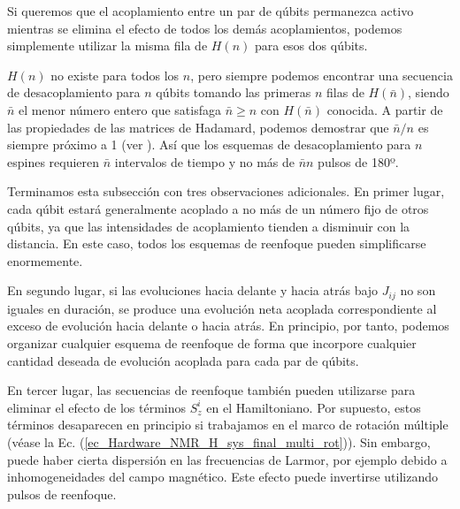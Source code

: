 \documentclass[a4paper,11pt]{book} %
\numberwithin{equation}{chapter}
\begin{document}
Si queremos que el acoplamiento entre un par de qúbits permanezca activo mientras se elimina el efecto de todos los demás acoplamientos, podemos simplemente utilizar la misma fila de $H(n)$ para esos dos qúbits. 

$H(n)$ no existe para todos los $n$, pero siempre podemos encontrar una secuencia de desacoplamiento para $n$ qúbits tomando las primeras $n$ filas de $H(\bar{n})$, siendo $\bar{n}$ el menor número entero que satisfaga $\bar{n} \geq n $ con $H(\bar{n})$ conocida. A partir de las propiedades de las matrices de Hadamard, podemos demostrar que $\bar{n}/n$ es siempre próximo a 1 (ver \cite{bib_Hardware_NMR_reenfoque_Hadammard_1}). Así que los esquemas de desacoplamiento para $n$ espines requieren $\bar{n}$ intervalos de tiempo y no más de $\bar{n}n$ pulsos de 180º.

Terminamos esta subsección con tres observaciones adicionales.
En primer lugar, cada qúbit estará generalmente acoplado a no más de un número fijo de otros qúbits, ya que las intensidades de acoplamiento tienden a disminuir con la distancia. En este caso, todos los esquemas de reenfoque pueden simplificarse enormemente. 

En segundo lugar, si las evoluciones hacia delante y hacia atrás bajo
$J_{ij}$ no son iguales en duración, se produce una evolución neta acoplada correspondiente al exceso de evolución hacia delante o hacia atrás. En principio, por tanto, podemos organizar cualquier esquema de reenfoque de forma que incorpore cualquier cantidad deseada de evolución acoplada para cada par de qúbits.

En tercer lugar, las secuencias de reenfoque también pueden utilizarse para eliminar el efecto de los términos $S_{z}^i$ en el Hamiltoniano. Por supuesto, estos términos desaparecen en principio si trabajamos en el marco de rotación múltiple (véase la Ec. (\ref{ec_Hardware_NMR_H_sys_final_multi_rot})). Sin embargo, puede haber cierta dispersión en las frecuencias de Larmor, por ejemplo debido a inhomogeneidades del campo magnético. Este efecto puede invertirse utilizando pulsos de reenfoque.


















	
\end{document}
